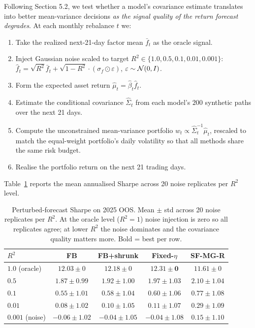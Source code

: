 Following \citet{huh2026marketgans} Section 5.2, we test whether a model's covariance estimate translates into better mean-variance decisions \emph{as the signal quality of the return forecast degrades}. At each monthly rebalance $t$ we:
\begin{enumerate}
  \item Take the realized next-21-day factor mean $\bar f_t$ as the oracle signal.
  \item Inject Gaussian noise scaled to target $R^2 \in \{1.0, 0.5, 0.1, 0.01, 0.001\}$:
        $\hat f_t = \sqrt{R^2} \bar f_t + \sqrt{1 - R^2} \cdot (\sigma_f \odot \varepsilon)$, $\varepsilon \sim \mathcal{N}(0, I)$.
  \item Form the expected asset return $\hat\mu_t = \hat\beta_t \hat f_t$.
  \item Estimate the conditional covariance $\hat\Sigma_t$ from each model's $200$ synthetic paths over the next 21 days.
  \item Compute the unconstrained mean-variance portfolio $w_t \propto \hat\Sigma_t^{-1} \hat\mu_t$, rescaled to match the equal-weight portfolio's daily volatility so that all methods share the same risk budget.
  \item Realise the portfolio return on the next 21 trading days.
\end{enumerate}

Table~\ref{tab:perturbed} reports the mean annualised Sharpe across 20 noise replicates per $R^2$ level.

\begin{table}[h]
\centering
\caption{Perturbed-forecast Sharpe on 2025 OOS. Mean $\pm$ std across 20 noise replicates per $R^2$. At the oracle level ($R^2 = 1$) noise injection is zero so all replicates agree; at lower $R^2$ the noise dominates and the covariance quality matters more. Bold = best per row.}
\label{tab:perturbed}
\small
\begin{tabular}{lcccc}
\toprule
$R^2$ & FB & FB+shrunk & Fixed-$\eta$ & \textbf{SF-MG-R} \\
\midrule
$1.0$   (oracle) & $12.03 \pm 0$ & $12.18 \pm 0$ & $\mathbf{12.31 \pm 0}$ & $11.61 \pm 0$ \\
$0.5$            & $1.87 \pm 0.99$ & $1.92 \pm 1.00$ & $1.97 \pm 1.03$ & $\mathbf{2.10 \pm 1.04}$ \\
$0.1$            & $0.55 \pm 1.01$ & $0.58 \pm 1.04$ & $0.60 \pm 1.06$ & $\mathbf{0.77 \pm 1.08}$ \\
$0.01$           & $0.08 \pm 1.02$ & $0.10 \pm 1.05$ & $0.11 \pm 1.07$ & $\mathbf{0.29 \pm 1.09}$ \\
$0.001$ (noise)  & $-0.06 \pm 1.02$ & $-0.04 \pm 1.05$ & $-0.04 \pm 1.08$ & $\mathbf{0.15 \pm 1.10}$ \\
\bottomrule
\end{tabular}
\end{table}

